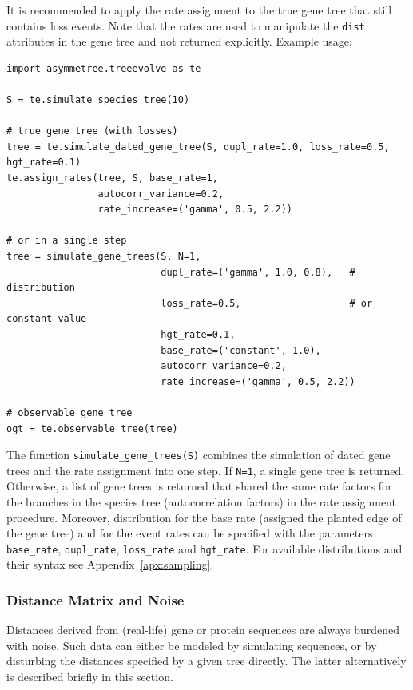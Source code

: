 \documentclass[hidelinks,11pt]{article}
\begin{document}
\noindent
It is recommended to apply the rate assignment to the true gene tree that still contains loss events.
Note that the rates are used to manipulate the \texttt{dist} attributes in the gene tree and not returned explicitly.
Example usage:
\begin{adjustwidth}{1cm}{1cm}\vspace{2mm}
\begin{verbatim}
import asymmetree.treeevolve as te

S = te.simulate_species_tree(10)

# true gene tree (with losses)
tree = te.simulate_dated_gene_tree(S, dupl_rate=1.0, loss_rate=0.5, hgt_rate=0.1)
te.assign_rates(tree, S, base_rate=1,
                autocorr_variance=0.2,
                rate_increase=('gamma', 0.5, 2.2))

# or in a single step
tree = simulate_gene_trees(S, N=1,
                           dupl_rate=('gamma', 1.0, 0.8),   # distribution
                           loss_rate=0.5,                   # or constant value
                           hgt_rate=0.1,
                           base_rate=('constant', 1.0),
                           autocorr_variance=0.2,
                           rate_increase=('gamma', 0.5, 2.2))

# observable gene tree
ogt = te.observable_tree(tree)
\end{verbatim}
\end{adjustwidth}

\noindent
The function \texttt{simulate\_gene\_trees(S)} combines the simulation of dated gene trees and the rate assignment into one step.
If \texttt{N=1}, a single gene tree is returned.
Otherwise, a list of gene trees is returned that shared the same rate factors for the branches in the species tree (autocorrelation factors) in the rate assignment procedure.
Moreover, distribution for the base rate (assigned the planted edge of the
gene tree) and for the event rates can be specified with the parameters
\texttt{base\_rate}, \texttt{dupl\_rate}, \texttt{loss\_rate} and
\texttt{hgt\_rate}.
For available distributions and their syntax see Appendix~\ref{apx:sampling}.


\subsubsection{Distance Matrix and Noise}

Distances derived from (real-life) gene or protein sequences are always burdened with noise.
Such data can either be modeled by simulating sequences, or by disturbing the distances specified by a given tree directly.
The latter alternatively is described briefly in this section.
\end{document}
